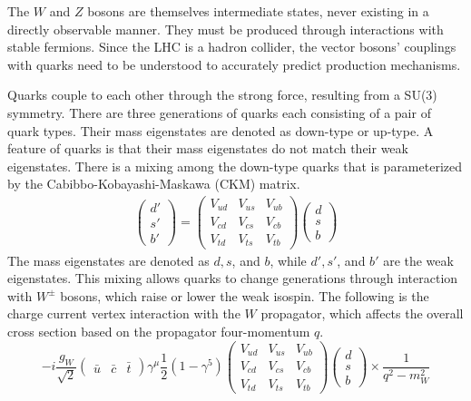 The $W$ and $Z$ bosons are themselves intermediate states,
never existing in a directly observable manner.
They must be produced through interactions with stable fermions.
Since the LHC is a hadron collider,
the vector bosons' couplings with quarks need to be understood to accurately predict production mechanisms.

Quarks couple to each other through the strong force,
resulting from a SU(3) symmetry.
There are three generations of quarks each consisting of a pair of quark types.
Their mass eigenstates are denoted as down-type or up-type.
A feature of quarks is that their mass eigenstates do not match their weak eigenstates.
There is a mixing among the down-type quarks that is parameterized by the
Cabibbo-Kobayashi-Maskawa (CKM) matrix.
\begin{gather}
  \left(
  \begin{matrix}
    d' \\
    s' \\
    b'
  \end{matrix}
  \right)
  =
  \left(
  \begin{matrix}
    V_{ud} & V_{us} & V_{ub} \\
    V_{cd} & V_{cs} & V_{cb} \\
    V_{td} & V_{ts} & V_{tb}
  \end{matrix}
  \right)
  \left(
  \begin{matrix}
    d \\
    s \\
    b
  \end{matrix}
  \right) \label{eq:ckm}
\end{gather}
The mass eigenstates are denoted as $d, s$, and $b$,
while $d', s'$, and $b'$ are the weak eigenstates.
This mixing allows quarks to change generations through interaction with $W^\pm$ bosons,
which raise or lower the weak isospin.
The following is the charge current vertex interaction with the $W$ propagator,
which affects the overall cross section based on the propagator four-momentum $q$.
\[
-i \frac{g_W}{\sqrt{2}}
\left(
\begin{matrix}
\bar{u} & \bar{c} & \bar{t}
\end{matrix}
\right)
\gamma^\mu \frac12 (1 - \gamma^5)
\left(
\begin{matrix}
  V_{ud} & V_{us} & V_{ub} \\
  V_{cd} & V_{cs} & V_{cb} \\
  V_{td} & V_{ts} & V_{tb}
\end{matrix}
\right)
\left(
\begin{matrix}
d \\ s \\ b
\end{matrix}
\right) \times \frac{1}{q^2 - m_{W}^2}
\]
